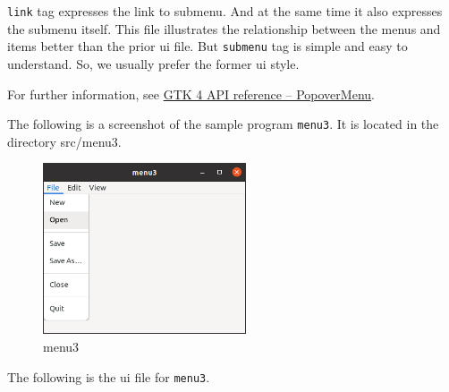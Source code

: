 \passthrough{\lstinline!link!} tag expresses the link to submenu. And at
the same time it also expresses the submenu itself. This file
illustrates the relationship between the menus and items better than the
prior ui file. But \passthrough{\lstinline!submenu!} tag is simple and
easy to understand. So, we usually prefer the former ui style.

For further information, see
\href{https://docs.gtk.org/gtk4/class.PopoverMenu.html\#menu-models}{GTK
4 API reference -- PopoverMenu}.

The following is a screenshot of the sample program
\passthrough{\lstinline!menu3!}. It is located in the directory
src/menu3.

\begin{figure}
\centering
\includegraphics[width=6cm,height=5.055cm]{../image/menu3.png}
\caption{menu3}
\end{figure}

The following is the ui file for \passthrough{\lstinline!menu3!}.

